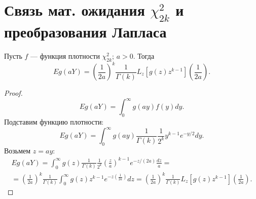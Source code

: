 \documentclass[../paper.tex]{subfiles}
\begin{document}
\section{Связь мат. ожидания $\chi^2_{2k}$ и преобразования Лапласа}
%
\begin{Th*}
Пусть $f$ --- функция плотности $\chi^2_{2k}$; $a > 0$. Тогда
\[
    Eg(aY) = \left(\frac{1}{2a}\right)^k \frac{1}{\Gamma(k)} L_z \left[ g(z) z^{k-1}  \right] \left( \frac{1}{2a} \right) 
.\]
\end{Th*}
\begin{proof}
\[
    Eg(aY) = \int_{0}^{\infty} g(ay) f(y) dy  
.\]
Подставим функцию плотности:
\[
    Eg(aY) = \int_{0}^{\infty} g(ay) \frac{1}{\Gamma(k)} \frac{1}{2^k} y^{k-1} e^{-y/2} dy 
.\]
Возьмем $z = ay$:
\begin{multline*}
    Eg(aY) = \int_{0}^{\infty} g(z) \frac{1}{\Gamma(k)} \frac{1}{2^k} \left( \frac{z}{a} \right)^{k-1} e^{-z/(2a)} \frac{dz}{a}
=\\=
    \left( \frac{1}{2a} \right)^k \frac{1}{\Gamma(k)} \int_{0}^{\infty} g(z) z^{k-1} e^{-z \left( \frac{1}{2a} \right) } dz = 
    \left( \frac{1}{2a} \right)^k \frac{1}{\Gamma(k)} L_z \left[ g(z) z^{k-1} \right] \left( \frac{1}{2a} \right) 
.\end{multline*}
\end{proof}
\end{document}
